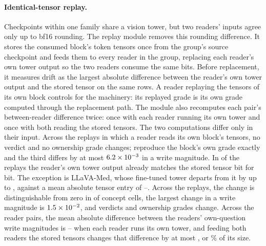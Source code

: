 \documentclass{article}
\begin{document}
\paragraph{Identical-tensor replay.} Checkpoints within one family share a vision tower, but two readers' inputs agree only up to bf16 rounding. The replay module removes this rounding difference. It stores the consumed block's token tensors once from the group's source checkpoint and feeds them to every reader in the group, replacing each reader's own tower output so the two readers consume the same bits. Before replacement, it measures drift as the largest absolute difference between the reader's own tower output and the stored tensor on the same rows. A reader replaying the tensors of its own block controls for the machinery: its replayed grade is its own grade computed through the replacement path. The module also recomputes each pair's between-reader difference twice: once with each reader running its own tower and once with both reading the stored tensors. The two computations differ only in their input. Across the \cfReplaySelf{} replays in which a reader reads its own block's tensors, no verdict and no ownership grade changes; \cfReplaySelfExact{} reproduce the block's own grade exactly and the third differs by at most $6.2\times10^{-3}$ in a write magnitude. In \cfReplayDriftZero{} of the \cfReplayBlocks{} replays the reader's own tower output already matches the stored tensor bit for bit. The exception is LLaVA-Med, whose fine-tuned tower departs from it by up to \cfReplayDriftMax{}, against a mean absolute tensor entry of \cfReplayTensorMin{}--\cfReplayTensorMax{}. Across the \cfReplayBlocks{} replays, the change is distinguishable from zero in \cfReplayMoved{} of \cfReplayCells{} concept cells, the largest change in a write magnitude is $1.5\times10^{-2}$, and \cfReplayVerdictChanges{} verdicts and \cfReplayOwnedChanges{} ownership grades change. Across the \cfReplayPairs{} reader pairs, the mean absolute difference between the readers' own-question write magnitudes is \cfReplayPairOwnMin{}--\cfReplayPairOwnMax{} when each reader runs its own tower, and feeding both readers the stored tensors changes that difference by at most \cfReplayChangeMax{}, or \cfReplayRelMax\% of its size.
\end{document}
